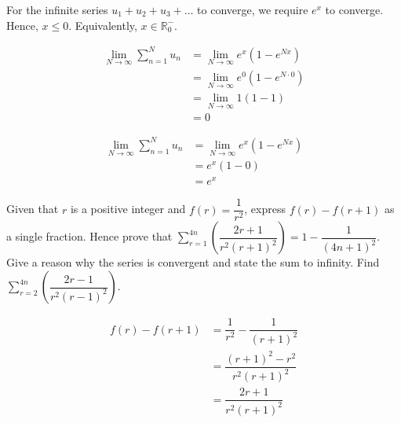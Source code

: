 \documentclass{jhwhw}
\begin{document}

        For the infinite series $u_1 + u_2 + u_3 + \ldots$ to converge, we require $e^x$ to converge. Hence, $x \leq 0$. Equivalently, $x \in \mathbb{R}^-_0$.


        \begin{align*}
            \lim_{N \rightarrow \infty} \sum\limits_{n=1}^N u_n &= \lim_{N \rightarrow \infty} e^x(1 - e^{Nx}) \\
            &= \lim_{N \rightarrow \infty} e^0(1 - e^{N\cdot0}) \\
            &= \lim_{N \rightarrow \infty} 1(1 - 1) \\
            &= 0
        \end{align*}


        \begin{align*}
            \lim_{N \rightarrow \infty} \sum\limits_{n=1}^N u_n &= \lim_{N \rightarrow \infty} e^x(1 - e^{Nx}) \\
            &= e^x(1 - 0)\\
            &= e^x
        \end{align*}


    \problem{}
        Given that $r$ is a positive integer and $f(r) = \dfrac1{r^2}$, express $f(r) - f(r+1)$ as a single fraction. Hence prove that $\sum\limits_{r=1}^{4n} \left(\dfrac{2r+1}{r^2(r+1)^2}\right) = 1 - \dfrac1{(4n+1)^2}$. Give a reason why the series is convergent and state the sum to infinity. Find $\sum\limits_{r=2}^{4n} \left(\dfrac{2r-1}{r^2(r-1)^2}\right)$.

    \solution
        \begin{align*}
            f(r) - f(r+1) &= \dfrac1{r^2} - \dfrac1{(r+1)^2}\\
            &= \dfrac{(r+1)^2 - r^2}{r^2(r+1)^2}\\
            &= \dfrac{2r+1}{r^2(r+1)^2}
        \end{align*}

\end{document}

